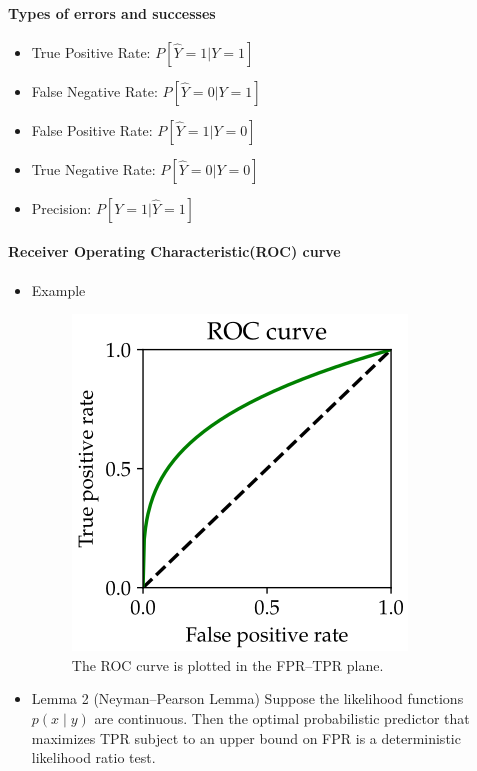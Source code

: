 \documentclass[a4paper]{article}
\begin{document}
\paragraph{Types of errors and successes}
\begin{itemize}
    \item True Positive Rate: $P[\hat{Y} = 1| Y=1]$
    \item False Negative Rate: $P[\hat{Y} = 0| Y=1]$
    \item False Positive Rate: $P[\hat{Y} = 1| Y=0]$
    \item True Negative Rate: $P[\hat{Y} = 0| Y=0]$
    \item Precision: $P[Y = 1| \hat{Y}=1]$
\end{itemize}

\paragraph{Receiver Operating Characteristic(ROC) curve}

\begin{itemize}
    \item Example
    \begin{figure} [H]
        \centering
        \includegraphics[width=0.5\linewidth]{image/roc.png}
        \caption{The ROC curve is plotted in the FPR–TPR plane.}
    \end{figure}
    \item Lemma 2 (Neyman–Pearson Lemma)
Suppose the likelihood functions $p(x \mid y)$ are continuous. Then the optimal probabilistic predictor that maximizes TPR subject to an upper bound on FPR is a deterministic likelihood ratio test.
\end{itemize}
\end{document}
